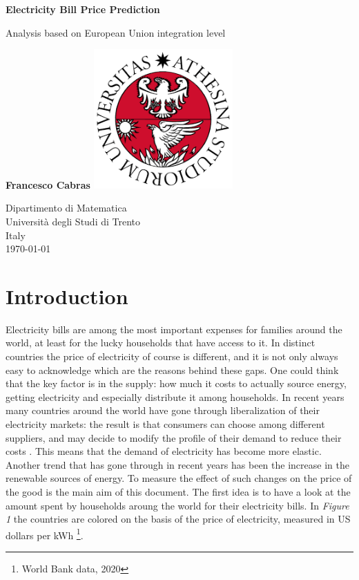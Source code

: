 \documentclass{book}
\begin{document}
\begin{titlepage}
   \begin{center}
       \vspace*{1cm}

       \textbf{Electricity Bill Price Prediction}

       \vspace{0.5cm}
       Analysis based on European Union integration level
            
       \vspace{1.5cm}
       \textbf{Francesco Cabras}
       \vfill
       \includegraphics[width=0.4\textwidth]{Images/unitn.png}            
       \vspace{0.8cm}
            
       Dipartimento di Matematica\\
       Università degli Studi di Trento\\
       Italy\\
       \today
            
   \end{center}
\end{titlepage}

\tableofcontents

\chapter{Introduction}

Electricity bills are among the most important expenses for families around the world, at least for the lucky households that have access to it. In distinct countries the price of electricity of course is different, and it is not only always easy to acknowledge which are the reasons behind these gaps. One could think that the key factor is in the supply: how much it costs to actually source energy, getting electricity and especially distribute it among households. In recent years many countries around the world have gone through liberalization of their electricity markets: the result is that consumers can choose among different suppliers, and may decide to modify the profile of their demand to reduce their costs \cite{867149}. This means that the demand of electricity has become more elastic. Another trend that has gone through in recent years has been the increase in the renewable sources of energy. To measure the effect of such changes on the price of the good is the main aim of this document. The first idea is to have a look at the amount spent by households aroung the world for their electricity bills.  In \textit{Figure 1} the countries are colored on the basis of the price of electricity, measured in US dollars per kWh \footnote{World Bank data, 2020}.
\end{document}
